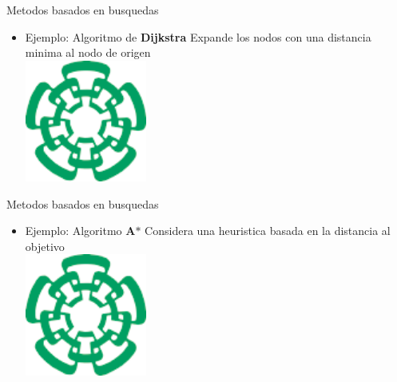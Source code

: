 \documentclass[
	11pt, %
]{beamer}
\begin{document}
\begin{frame}{Metodos basados en busquedas}
  \begin{itemize}
  \item Ejemplo: Algoritmo de \textbf{Dijkstra} Expande los nodos con una distancia minima al nodo de origen\\
    \centering
    \includegraphics[angle=45,width=4cm]{cinvestavlogo}
  \end{itemize}
\end{frame}

\begin{frame}{Metodos basados en busquedas}
  \begin{itemize}
  \item Ejemplo: Algoritmo \textbf{A$*$} Considera una heuristica basada en la distancia al objetivo\\
    \centering
    \includegraphics[angle=45,width=4cm]{cinvestavlogo}
  \end{itemize}
\end{frame}
\end{document}
